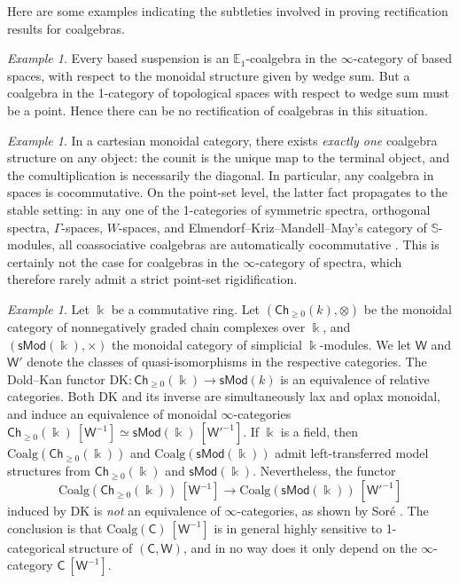 \documentclass{proc-l}
\theoremstyle{plain}
\theoremstyle{definition}
\theoremstyle{remark}
\newtheorem{example}[{theorem}]{Example}
\newcommand{\kk}{\Bbbk}
\begin{document}
Here are some examples indicating the subtleties involved in proving rectification results for coalgebras.

\begin{example}%
\label{Example:1.5}Every based suspension is an $\mathbb E_1$-coalgebra in the $\infty$-category of based spaces, with respect to the monoidal structure given by wedge sum. But a coalgebra in the 1-category of topological spaces with respect to wedge sum must be a point. Hence there can be no rectification of coalgebras in this situation.
\end{example}

\begin{example}%
\label{Example:1.6}In a cartesian monoidal category, there exists \emph{exactly one} coalgebra structure on any object: the counit is the unique map to the terminal object, and the comultiplication is necessarily the diagonal. In particular, any coalgebra in spaces is cocommutative. On the point-set level, the latter fact propagates to the stable setting: in any one of the 1-categories of symmetric spectra, orthogonal spectra, $\Gamma$-spaces, $W$-spaces, and Elmendorf--Kriz--Mandell--May's category of $\mathbb S$-modules, all coassociative coalgebras are automatically cocommutative \cite{ps}. This is certainly not the case for coalgebras in the $\infty$-category of spectra, which therefore rarely admit a strict point-set rigidification.
\end{example}

\begin{example}%
\label{Example:1.7}Let $\kk$ be a commutative ring. Let $(\mathsf{Ch}_{\geq 0}(k),\otimes)$ be the monoidal category of nonnegatively graded chain complexes over $\kk$, and $(\mathsf{sMod}(\kk),\times)$ the monoidal category of simplicial $\kk$-modules. We let $\mathsf W$ and $\mathsf W'$ denote the classes of quasi-isomorphisms in the respective categories. The Dold--Kan functor
$\mathrm{DK} : \mathsf{Ch}_{\geq 0}(\kk) \longrightarrow \mathsf{sMod}(k)$
is an equivalence of relative categories. Both $\mathrm{DK}$ and its inverse are simultaneously lax and oplax monoidal, and induce an equivalence of monoidal $\infty$-categories $\mathsf{Ch}_{\geq 0}(\kk)~[\mathsf W^{-1}] \simeq \mathsf{sMod}(\kk)~[\mathsf W'^{-1}]$. If $\kk$ is a field, then $\mathrm{Coalg}(\mathsf{Ch}_{\geq 0}(\kk))$ and $\mathrm{Coalg}(\mathsf{sMod}(\kk))$ admit left-transferred model structures from $\mathsf{Ch}_{\geq 0}(\kk)$ and $\mathsf{sMod}(\kk)$. Nevertheless, the  functor
\[
\mathrm{Coalg}(\mathsf{Ch}_{\geq 0}(\kk))~[\mathsf W^{-1}] \longrightarrow \mathrm{Coalg}(\mathsf{sMod}(\kk))~[\mathsf W'^{-1}]
\]
induced by $\mathrm{DK}$ is \emph{not} an equivalence of $\infty$-categories, as shown by Sor\'e \cite{sore}. The conclusion is that $\mathrm{Coalg}(\mathsf C)~[\mathsf W^{-1}]$ is in general highly sensitive to 1-categorical structure of $(\mathsf C,\mathsf W)$, and in no way does it only depend on the $\infty$-category $\mathsf C~[\mathsf W^{-1}]$.
\end{example}
\end{document}
